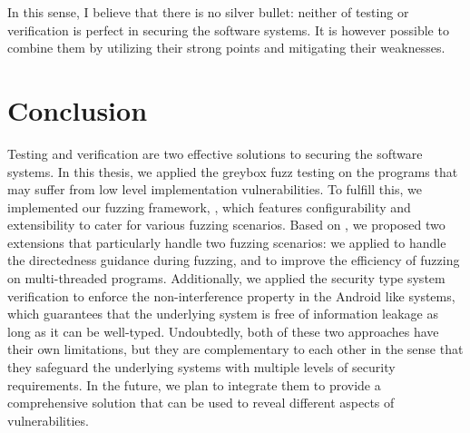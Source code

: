 In this sense, I believe that there is no silver bullet: neither of testing or verification is perfect in securing the software systems. It is however possible to combine them by utilizing their strong points and mitigating their weaknesses.


\section{Conclusion}\label{sec:conclusion}


Testing and verification are two effective solutions to securing the software systems. In this thesis, we applied the greybox fuzz testing on the programs that may suffer from low level implementation vulnerabilities. To fulfill this, we implemented our fuzzing framework, \FOT, which features configurability and extensibility to cater for various fuzzing scenarios. Based on \FOT, we proposed two extensions that particularly handle two fuzzing scenarios: we applied \dFOT to handle the directedness guidance during fuzzing, and \mtfuzz to improve the efficiency of fuzzing on multi-threaded programs. Additionally, we applied the security type system verification to enforce the non-interference property in the Android like systems, which guarantees that the underlying system is free of information leakage as long as it can be well-typed. Undoubtedly, both of these two approaches have their own limitations, but they are complementary to each other in the sense that they safeguard the underlying systems with multiple levels of security requirements. In the future, we plan to integrate them to provide a comprehensive solution that can be used to reveal different aspects of vulnerabilities.
